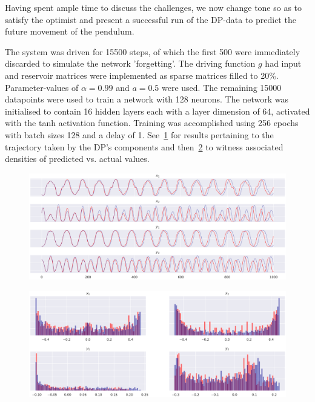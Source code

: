 Having spent ample time to discuss the challenges, we now change tone so as to satisfy the optimist and present a successful run of the DP-data to predict the future movement of the pendulum.

The system was driven for 15500 steps, of which the first 500 were immediately discarded to simulate the network 'forgetting'. The driving function $g$ had input and reservoir matrices were implemented as sparse matrices filled to 20\%. Parameter-values of $\alpha=0.99$ and $a=0.5$ were used.
The remaining 15000 datapoints were used to train a network with 128 neurons. 
The network was initialised to contain 16 hidden layers each with a layer dimension of 64, activated with the tanh activation function.
Training was accomplished using 256 epochs with batch sizes 128 and a delay of 1. See~\ref{fig:dp_success_traj} for results pertaining to the trajectory taken by the DP's components and then~\ref{fig:dp_success_density} to witness associated densities of predicted vs. actual values.


\begin{figure}[ht]
  \centering
  \includegraphics[width=0.95\linewidth]{Graphs/_dp_success_4coords_traj.eps} 
  \label{fig:dp_success_traj}
\end{figure}
\begin{figure}[ht]
  \centering
  \includegraphics[width=\linewidth]{Graphs/_dp_success_4coords_hist.eps}
  \label{fig:dp_success_density}
 \end{figure}
  

